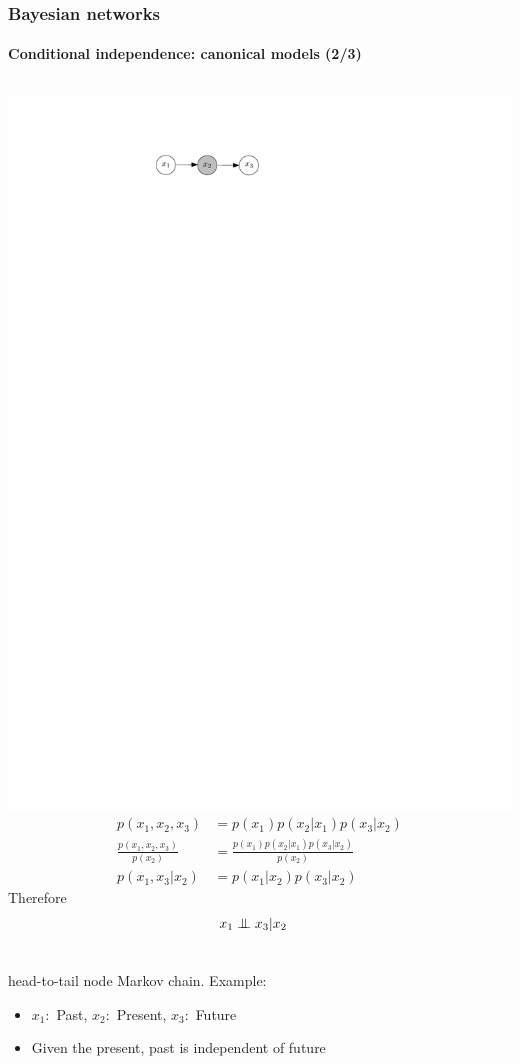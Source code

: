 \documentclass[slidestop,compress,mathserif]{beamer}
\newcommand{\bi}{\begin{itemize}}
\newcommand{\ei}{\end{itemize}}
\newcommand{\indep}{\ensuremath{\perp\mkern -10mu \perp}}
\begin{document}
\begin{frame}
	\frametitle{Bayesian networks}
	\framesubtitle{Conditional independence: canonical models (2/3)}
  \begin{columns}
    \includegraphics[width=.8\textwidth]{tailtohead2}%
   \begin{align*}
   p(x_1,x_2,x_3) & = p(x_1)p(x_2|x_1)p(x_3|x_2)\\
   \frac{p(x_1,x_2,x_3)}{p(x_2)} & = \frac{p(x_1)p(x_2|x_1)p(x_3|x_2)}{p(x_2)}\\
   p(x_1,x_3|x_2)           & = p(x_1|x_2)p(x_3|x_2)
   \end{align*}
  Therefore 
   \begin{align*}
    x_1 & \indep x_3 | x_2
   \end{align*}
   \end{columns} 
    \begin{block}{head-to-tail node}
    Markov chain. Example:
    \bi
    \item
     $x_1: $ Past, $x_2 :$ Present, $x_3 :$ Future
    \item  
    Given the present, past is independent of future
    \ei
    \end{block}
\end{frame}
\end{document}
